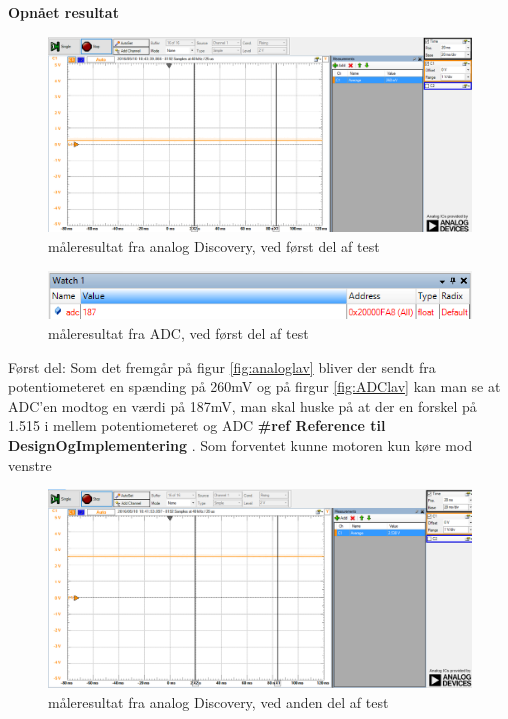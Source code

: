 \textbf{Opnået resultat}
\begin{figure}[H]
	\centering
	\includegraphics[width=\textwidth]{test/images/ModultestADC/260mVanalog}
	\caption{måleresultat fra analog Discovery, ved først del af test}
	\label{figure:analoglav}
\end{figure}
\begin{figure}[H]
	\centering
	\includegraphics[width=\textwidth]{test/images/ModultestADC/nedDebug}
	\caption{måleresultat fra ADC, ved først del af test}
	\label{figure: ADClav}
\end{figure}
Først del: Som det fremgår på figur \ref{fig:analoglav} bliver der sendt fra potentiometeret  en spænding på 260mV og på firgur \ref{fig:ADClav} kan man se at ADC’en modtog en værdi på 187mV, man skal huske på at der en forskel på 1.515 i mellem potentiometeret og ADC \textbf{\#ref Reference til DesignOgImplementering }. 
Som forventet kunne motoren kun køre mod venstre\\
\begin{figure}[H]
	\centering
	\includegraphics[width=\textwidth]{test/images/ModultestADC/2538Vanalog}
	\caption{måleresultat fra analog Discovery, ved anden del af test}
	\label{figure:analogmid}
\end{figure}
